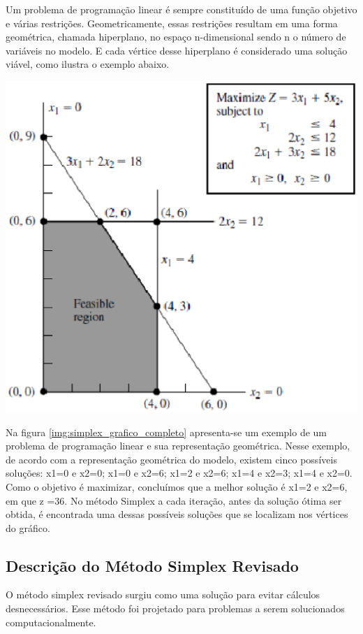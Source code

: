 Um problema de programação linear é sempre constituído de uma função objetivo e várias restrições. Geometricamente, essas restrições resultam em uma forma geométrica, chamada hiperplano, no espaço n-dimensional sendo n o número de variáveis no modelo. E cada vértice desse hiperplano é considerado uma solução viável, como ilustra o exemplo abaixo.
\begin{center}
	\includegraphics[scale=0.5]{graficos/Simplex_grafico_completo}
	\label{img:simplex_grafico_completo}
	\cite{Hillier}
\end{center}

Na figura \ref{img:simplex_grafico_completo} apresenta-se um exemplo de um problema de programação linear e sua representação geométrica. Nesse exemplo, de acordo com a representação geométrica do modelo, existem cinco possíveis soluções: x1=0 e  x2=0; x1=0 e  x2=6; x1=2 e  x2=6; x1=4 e  x2=3; x1=4 e x2=0. Como o objetivo é maximizar, concluímos que a melhor solução é x1=2 e  x2=6, em que z =36. No método Simplex a cada iteração, antes da solução ótima ser obtida, é encontrada uma dessas possíveis soluções que se localizam nos vértices do gráfico.

\subsection{Descrição do Método Simplex Revisado}
O método simplex revisado surgiu como uma solução para evitar cálculos desnecessários. Esse método foi projetado para problemas a serem solucionados computacionalmente.

